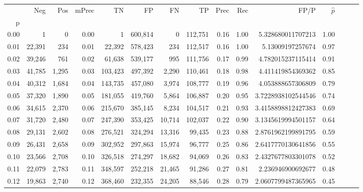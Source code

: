 \begin{tabular}{rrrrrrrrrrrrrrr}
\toprule
{} &     Neg &    Pos & mPrec &       TN &       FP &       FN &       TP &  Prec &   Rec &                    FP/P & $\hat{p}$ \\
p    &         &        &       &          &          &          &          &       &       &                         &           \\
\midrule
0.00 &       1 &      0 &  0.00 &        1 &  600,814 &        0 &  112,751 &  0.16 &  1.00 &       5.328680011707213 &      1.00 \\
0.01 &  22,391 &    234 &  0.01 &   22,392 &  578,423 &      234 &  112,517 &  0.16 &  1.00 &        5.13009197257674 &      0.97 \\
0.02 &  39,246 &    761 &  0.02 &   61,638 &  539,177 &      995 &  111,756 &  0.17 &  0.99 &       4.782015237115414 &      0.91 \\
0.03 &  41,785 &  1,295 &  0.03 &  103,423 &  497,392 &    2,290 &  110,461 &  0.18 &  0.98 &       4.411419854369362 &      0.85 \\
0.04 &  40,312 &  1,684 &  0.04 &  143,735 &  457,080 &    3,974 &  108,777 &  0.19 &  0.96 &       4.053888657306809 &      0.79 \\
0.05 &  37,320 &  1,890 &  0.05 &  181,055 &  419,760 &    5,864 &  106,887 &  0.20 &  0.95 &      3.7228938102544546 &      0.74 \\
0.06 &  34,615 &  2,370 &  0.06 &  215,670 &  385,145 &    8,234 &  104,517 &  0.21 &  0.93 &      3.4158898812427383 &      0.69 \\
0.07 &  31,720 &  2,480 &  0.07 &  247,390 &  353,425 &   10,714 &  102,037 &  0.22 &  0.90 &      3.1345619994501157 &      0.64 \\
0.08 &  29,131 &  2,602 &  0.08 &  276,521 &  324,294 &   13,316 &   99,435 &  0.23 &  0.88 &      2.8761962199891795 &      0.59 \\
0.09 &  26,431 &  2,658 &  0.09 &  302,952 &  297,863 &   15,974 &   96,777 &  0.25 &  0.86 &      2.6417770130641856 &      0.55 \\
0.10 &  23,566 &  2,708 &  0.10 &  326,518 &  274,297 &   18,682 &   94,069 &  0.26 &  0.83 &      2.4327677803301078 &      0.52 \\
0.11 &  22,079 &  2,783 &  0.11 &  348,597 &  252,218 &   21,465 &   91,286 &  0.27 &  0.81 &       2.236946900692677 &      0.48 \\
0.12 &  19,863 &  2,740 &  0.12 &  368,460 &  232,355 &   24,205 &   88,546 &  0.28 &  0.79 &      2.0607799487365965 &      0.45 \\

\end{tabular}
